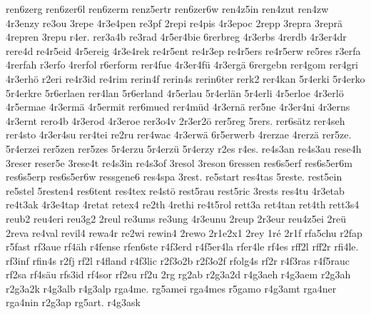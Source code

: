{    ren6zerg
    ren6zer6l
    ren6zerm
    renz5ertr
    ren6zer6w
    ren4z5in
    ren4zut
    ren4zw
    4r3enzy
    re3ou
    3repe
    4r3e4pen
    re3pf
    2repi
    re4pis
    4r3epoc
    2repp
    3repra
    3reprä
    4repren
    3repu
    r4er.
    rer3a4b
    re3rad
    4r5er4bie
    6rerbreg
    4r3erbs
    4rerdb
    4r3er4dr
    rere4d
    re4r5eid
    4r5ereig
    4r3e4rek
    re4r5ent
    re4r3ep
    re4r5ers
    re4r5erw
    re5res
    r3erfa
    4rerfah
    r3erfo
    4rerfol
    r6erform
    rer4fue
    4r3er4fü
    4r3ergä
    6rergebn
    rer4gom
    rer4gri
    4r3erhö
    r2eri
    re4r3id
    re4rim
    rerin4f
    rerin4s
    rerin6ter
    rerk2
    rer4kan
    5r4erki
    5r4erko
    5r4erkre
    5r6erlaen
    rer4lan
    5r6erland
    4r5erlau
    5r4erlän
    5r4erli
    4r5erloe
    4r3erlö
    4r5ermae
    4r3ermä
    4r5ermit
    rer6mued
    rer4müd
    4r3ernä
    rer5ne
    4r3er4ni
    4r3erns
    4r3ernt
    rero4b
    4r3erod
    4r3eroe
    rer3o4v
    2r3er2ö
    rer5reg
    5rers.
    rer6sätz
    rer4seh
    rer4sto
    4r3er4su
    rer4tei
    re2ru
    rer4wac
    4r3erwä
    6r5erwerb
    4rerzae
    4rerzä
    rer5ze.
    5r4erzei
    rer5zen
    rer5zes
    5r4erzu
    5r4erzü
    5r4erzy
    r2es
    r4es.
    re4s3an
    re4s3au
    rese4h
    3reser
    reser5e
    3rese4t
    re4s3in
    re4s3of
    3resol
    3reson
    6ressen
    res6s5erf
    res6s5er6m
    res6s5erp
    res6s5er6w
    ressgene6
    res4spa
    3rest.
    re5start
    res4tas
    5reste.
    rest5ein
    re5stel
    5resten4
    res6tent
    res4tex
    re4stö
    rest5rau
    rest5ric
    3rests
    res4tu
    4r3etab
    re4t3ak
    4r3e4tap
    4retat
    retex4
    re2th
    4rethi
    re4t5rol
    rett3a
    ret4tan
    ret4th
    rett3s4
    reub2
    reu4eri
    reu3g2
    2reul
    re3ums
    re3ung
    4r3eunu
    2reup
    2r3eur
    reu4z5ei
    2reü
    2reva
    re4val
    revil4
    rewa4r
    re2wi
    rewin4
    2rewo
    2r1e2x1
    2rey
    1ré
    2r1f
    rfa5chu
    r2fap
    r5fast
    rf3aue
    rf4äh
    r4fense
    rfen6ste
    r4f3erd
    r4f5er4la
    rfer4le
    rf4es
    rff2l
    rff2r
    rfi4le.
    rf3inf
    rfin4s
    r2fj
    rf2l
    r4fland
    r4f3lic
    r2f3o2b
    r2f3o2f
    rfolg4s
    rf2r
    r4f3ras
    r4f5rauc
    rf2sa
    rf4säu
    rfs3id
    rf4sor
    rf2su
    rf2u
    2rg
    rg2ab
    r2g3a2d
    r4g3aeh
    r4g3aem
    r2g3ah
    r2g3a2k
    r4g3alb
    r4g3alp
    rga4me.
    rg5amei
    rga4mes
    r5gamo
    r4g3amt
    rga4ner
    rga4nin
    r2g3ap
    rg5art.
    r4g3ask
}
